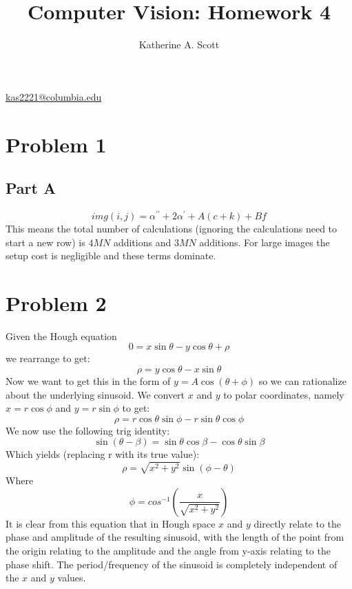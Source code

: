 \documentclass{article}
\begin{document}
\title{Computer Vision: Homework 4}

\author{Katherine A. Scott}
\maketitle
\mbox{}
\begin{center}
\href{mailto:katherineAScott@gmail.com}{kas2221@columbia.edu}

\end{center}
\section{Problem 1}
\subsection{Part A}
\[
img(i,j)=\alpha^{\prime\prime} +2\alpha^{\prime} + A(c+k)+Bf 
\]
This means the total number of calculations (ignoring the calculations need to start a new row) is $4MN$ additions and $3MN$ additions. For large images the setup cost is negligible and these terms dominate. 
\section{Problem 2}
Given the Hough equation 
\[
0 = x\sin{\theta}-y\cos{\theta}+\rho
\]
we rearrange to get:
\[
\rho = y\cos{\theta} - x\sin{\theta}
\]
Now we want to get this in the form of $y=A\cos{(\theta+\phi)}$ so we can rationalize about the underlying sinusoid. We convert $x$ and $y$ to polar coordinates, namely $x=r\cos{\phi}$ and $y=r\sin{\phi}$ to get:
\[
\rho = r \cos{\theta}\sin{\phi}-r\sin{\theta}\cos{\phi}
\]
We now use the following trig identity:
\[
\sin{(\theta-\beta)}=\sin{\theta}\cos{\beta}-\cos{\theta}\sin{\beta}
\]
Which yields (replacing r with its true value):
\[
\rho = \sqrt{x^{2}+y^{2}}
\sin{(\phi-\theta)}
\]
Where
\[
\phi = cos^{-1}{(\frac{x}{\sqrt{x^{2}+y^{2}}})}
\]
It is clear from this equation that in Hough space $x$ and $y$ directly relate to the phase and amplitude of the resulting sinusoid, with the length of the point from the origin relating to the amplitude and the angle from y-axis relating to the phase shift. The period/frequency of the sinusoid is completely independent of the $x$ and $y$ values.
\end{document}
